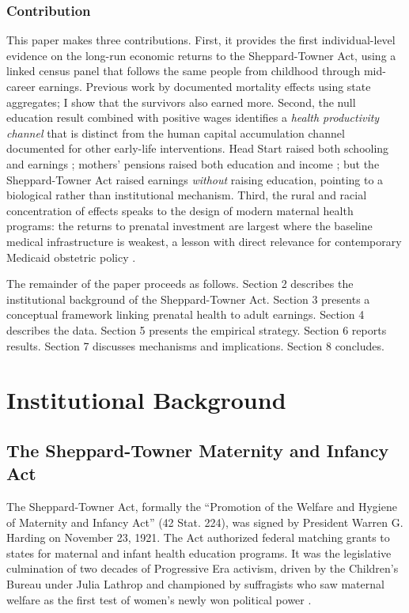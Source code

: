 \documentclass[12pt]{article}
\begin{document}
\subsubsection*{Contribution} This paper makes three contributions. First, it provides the first individual-level evidence on the long-run economic returns to the Sheppard-Towner Act, using a linked census panel that follows the same people from childhood through mid-career earnings. Previous work by \citet{moehlingthomasson2014} documented mortality effects using state aggregates; I show that the survivors also earned more. Second, the null education result combined with positive wages identifies a \textit{health productivity channel} that is distinct from the human capital accumulation channel documented for other early-life interventions. Head Start raised both schooling and earnings \citep{baileyetal2020}; mothers' pensions raised both education and income \citep{aizerletal2016}; but the Sheppard-Towner Act raised earnings \textit{without} raising education, pointing to a biological rather than institutional mechanism. Third, the rural and racial concentration of effects speaks to the design of modern maternal health programs: the returns to prenatal investment are largest where the baseline medical infrastructure is weakest, a lesson with direct relevance for contemporary Medicaid obstetric policy \citep{anderson2018}.

The remainder of the paper proceeds as follows. Section 2 describes the institutional background of the Sheppard-Towner Act. Section 3 presents a conceptual framework linking prenatal health to adult earnings. Section 4 describes the data. Section 5 presents the empirical strategy. Section 6 reports results. Section 7 discusses mechanisms and implications. Section 8 concludes.


\section{Institutional Background}

\subsection{The Sheppard-Towner Maternity and Infancy Act}

The Sheppard-Towner Act, formally the ``Promotion of the Welfare and Hygiene of Maternity and Infancy Act'' (42 Stat. 224), was signed by President Warren G. Harding on November 23, 1921. The Act authorized federal matching grants to states for maternal and infant health education programs. It was the legislative culmination of two decades of Progressive Era activism, driven by the Children's Bureau under Julia Lathrop and championed by suffragists who saw maternal welfare as the first test of women's newly won political power \citep{lindenmeyer1997, meckel2020}.
\end{document}
